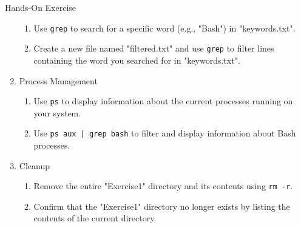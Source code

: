 \documentclass[ignorenonframetext,xcolor=dvipsnames]{beamer}
\begin{document}
\begin{frame}[allowframebreaks]{Hands-On Exercise}
\begin{enumerate}
\begin{enumerate}
	\item Use \texttt{grep} to search for a specific word (e.g., "Bash") in "keywords.txt".
	\item Create a new file named "filtered.txt" and use \texttt{grep} to filter lines containing the word you searched for in "keywords.txt".
\end{enumerate}
\item Process Management
\begin{enumerate}
	\item Use \texttt{ps} to display information about the current processes running on your system.
	\item Use \texttt{ps aux | grep bash} to filter and display information about Bash processes.
\end{enumerate}
\item Cleanup
\begin{enumerate}
	\item Remove the entire "Exercise1" directory and its contents using \texttt{rm -r}.
	\item Confirm that the "Exercise1" directory no longer exists by listing the contents of the current directory.
\end{enumerate}
\end{enumerate}
\end{frame}
\end{document}
